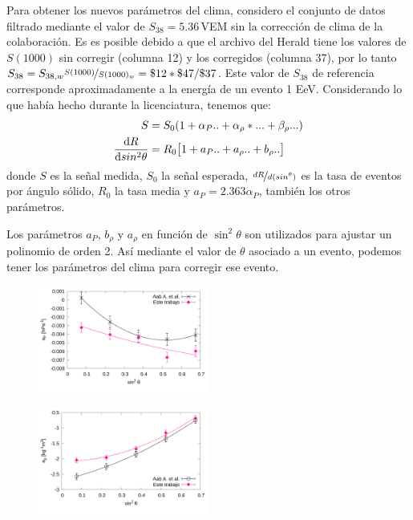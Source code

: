 Para obtener los nuevos parámetros del clima, considero el conjunto de datos filtrado mediante el valor de $S_{38}=5.36\,$VEM sin la corrección de clima de la colaboración. Es es posible debido a que el archivo del Herald tiene los valores de $S(1000)$ sin corregir (columna 12) y los corregidos (columna 37), por lo tanto $S_{38}= S_{38,w}\nicefrac{S(1000)}{S(1000)_w} = \$12*\$47/\$37$. Este valor de $S_{38}$ de referencia corresponde aproximadamente a la energía de un evento 1 EeV. Considerando lo que había hecho durante la licenciatura, tenemos que:
\begin{align}
    S &= S_0 (1 + \alpha_P..+ \alpha_\rho*... + \beta_\rho...)\\
    \dv{R}{sin^2\theta} &=  R_0 \big[ 1 + a_P.. + a_\rho ..+ b_\rho..  \big]
\end{align}
donde $S$ es la señal medida, $S_0$ la señal esperada, $\nicefrac{dR}{d(sin^\theta)}$ es la tasa de eventos por ángulo sólido, $R_0$ la tasa media y  $a_P = 2.363 \alpha_P$, también  los otros parámetros.

Los parámetros $a_P$, $b_\rho$ y $a_\rho$ en función de $\sin^2 \theta$ son utilizados para ajustar un polinomio de orden 2. Así mediante el  valor de $\theta$ asociado a un evento, podemos tener los parámetros del clima para corregir ese evento.

\begin{figure}[H]
    \begin{small}
        \begin{center}
            \includegraphics[width=0.5\textwidth]{ap.pdf}
        \end{center}
        \caption{}
        \label{fig:}
    \end{small}
\end{figure}


\begin{figure}[H]
    \begin{small}
        \begin{center}
            \includegraphics[width=0.5\textwidth]{arho.pdf}
        \end{center}
        \caption{}
        \label{fig:}
    \end{small}
\end{figure}


